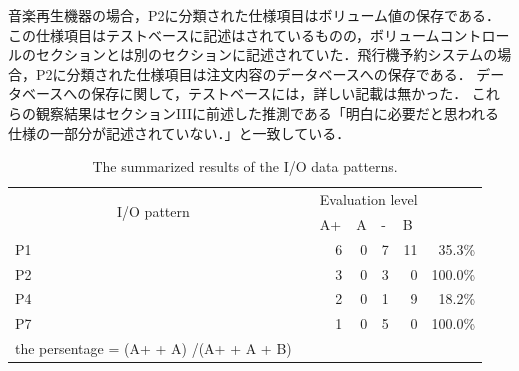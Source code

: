 \documentclass[a4paper,12pt]{jreport}
\begin{document}
 音楽再生機器の場合，P2に分類された仕様項目はボリューム値の保存である．この仕様項目はテストベースに記述はされているものの，ボリュームコントロールのセクションとは別のセクションに記述されていた．飛行機予約システムの場合，P2に分類された仕様項目は注文内容のデータベースへの保存である． データベースへの保存に関して，テストベースには，詳しい記載は無かった． これらの観察結果はセクションIIIに前述した推測である「明白に必要だと思われる仕様の一部分が記述されていない．」と一致している．


\begin{table}[htbp]
  \centering
  \caption{The summarized results of the I/O data patterns.}
    \begin{tabular}{lrrrrrr}
\cline{1-6}    \multicolumn{1}{|c}{\multirow{2}[4]{*}{I/O pattern }} & \multicolumn{1}{r|}{} & \multicolumn{4}{c|}{Evaluation level} &  \bigstrut\\
\cline{3-6}    \multicolumn{1}{|c}{} & \multicolumn{1}{r|}{} & \multicolumn{1}{l|}{A+} & \multicolumn{1}{l|}{A} & \multicolumn{1}{l|}{-} & \multicolumn{1}{l|}{B} &  \bigstrut\\
\cline{1-6}    \multicolumn{1}{|l|}{P1} & \multicolumn{1}{r|}{} & \multicolumn{1}{r|}{6} & \multicolumn{1}{r|}{0} & \multicolumn{1}{r|}{7} & \multicolumn{1}{r|}{11} & 35.3\% \bigstrut\\
\cline{1-6}    \multicolumn{1}{|l|}{P2} & \multicolumn{1}{r|}{} & \multicolumn{1}{r|}{3} & \multicolumn{1}{r|}{0} & \multicolumn{1}{r|}{3} & \multicolumn{1}{r|}{0} & 100.0\% \bigstrut\\
\cline{1-6}    \multicolumn{1}{|l|}{P4} & \multicolumn{1}{r|}{} & \multicolumn{1}{r|}{2} & \multicolumn{1}{r|}{0} & \multicolumn{1}{r|}{1} & \multicolumn{1}{r|}{9} & 18.2\% \bigstrut\\
\cline{1-6}    \multicolumn{1}{|l|}{P7} & \multicolumn{1}{r|}{} & \multicolumn{1}{r|}{1} & \multicolumn{1}{r|}{0} & \multicolumn{1}{r|}{5} & \multicolumn{1}{r|}{0} & 100.0\% \bigstrut\\
\cline{1-6}    the persentage = (A+  +  A) /(A+  +  A + B)  &       &       &       &       &       &  \bigstrut[t]\\
    \end{tabular}%
  \label{tbl:D-3-tbl9}%
\end{table}%
\end{document}
